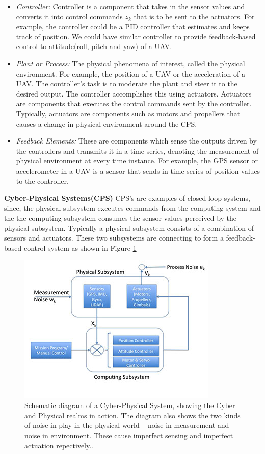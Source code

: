 \begin{itemize}
    \item \textit{Controller:} Controller is a component that takes in the sensor values and converts it into control commands $z_k$ that is to be sent to the actuators. For example, the controller could be a PID controller that estimates and keeps track of position. We could have similar controller to provide feedback-based control to attitude(roll, pitch and yaw) of a UAV.
	\item \textit{Plant or Process:} The physical phenomena of interest, called the physical environment. For example, the position of a UAV or the acceleration of a UAV. The controller's task is to moderate the plant and steer it to the desired output. The controller accomplishes this using actuators. Actuators are components that executes the control commands sent by the controller. Typically, actuators are components such as motors and propellers that causes a change in physical environment around the CPS.
	\item \textit{Feedback Elements:} These are components which sense the outputs driven by the controllers and transmits it in a time-series, denoting the measurement of physical environment at every time instance. For example, the GPS sensor or accelerometer in a UAV is a sensor that sends in time series of position values to the controller.
 

\end{itemize}

\textbf{Cyber-Physical Systems(CPS)} CPS's are examples of closed loop systems, since, the physical subsystem executes commands from the computing system and the the computing subsystem consumes the sensor values perceived by the physical subsystem. Typically a physical subsystem consists of a combination of sensors and actuators. These two subsystems are connecting to form a feedback-based control system as shown in Figure \ref{fig:cps}

\begin{figure}
    \includegraphics[scale=0.60]{images/cps-fig-small.jpg}
    \caption{Schematic diagram of a Cyber-Physical System, showing the Cyber and Physical realms in action. The diagram also shows the two kinds of noise in play in the physical world -- noise in measurement and noise in environment. These cause imperfect sensing and imperfect actuation repectively..}
    \label{fig:cps}
\end{figure}


